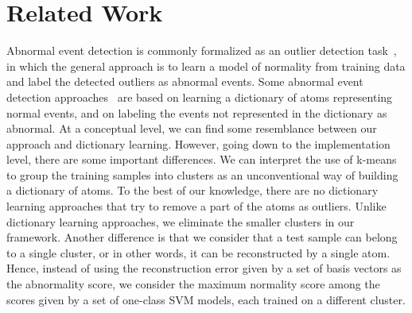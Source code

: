 \documentclass[10pt,twocolumn,letterpaper]{article}
\begin{document}
\vspace*{-0.2cm}
\section{Related Work}
\label{sec_RelatedWork}
\vspace*{-0.1cm}

Abnormal event detection is commonly formalized as an outlier detection task~\cite{Antic-ICCV-2011,Cheng-CVPR-2015,Cong-CVPR-2011,Dutta-AAAI-2015,Kim-CVPR-2009,Li-PAMI-2014,Lu-ICCV-2013,Mahadevan-CVPR-2010,Mehran-CVPR-2009,Ren-BMVC-2015,Sun-PR-2017,Xu-BMVC-2015,Zhang-PR-2016,Zhao-CVPR-2011}, in which the general approach is to learn a model of normality from training data and label the detected outliers as abnormal events. Some abnormal event detection approaches~\cite{Cheng-CVPR-2015,Cong-CVPR-2011,Dutta-AAAI-2015,Lu-ICCV-2013,Ren-BMVC-2015} are based on learning a dictionary of atoms representing normal events, and on labeling the events not represented in the dictionary as abnormal. At a conceptual level, we can find some resemblance between our approach and dictionary learning. However, going down to the implementation level, there are some important differences. We can interpret the use of k-means to group the training samples into clusters as an unconventional way of building a dictionary of atoms. To the best of our knowledge, there are no dictionary learning approaches that try to remove a part of the atoms as outliers. Unlike dictionary learning approaches, we eliminate the smaller clusters in our framework. Another difference is that we consider that a test sample can belong to a single cluster, or in other words, it can be reconstructed by a single atom. Hence, instead of using the reconstruction error given by a set of basis vectors as the abnormality score, we consider the maximum normality score among the scores given by a set of one-class SVM models, each trained on a different cluster. 
\end{document}
